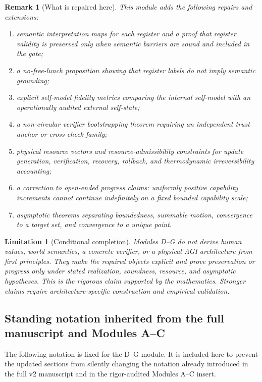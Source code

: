 \documentclass[11pt]{article}
\newtheorem{remark}[theorem]{Remark}
\newtheorem{limitation}[theorem]{Limitation}
\newcommand{\1}{\mathbf{1}}
\begin{document}
\begin{remark}[What is repaired here]
This module adds the following repairs and extensions:
\begin{enumerate}[label=(\alph*)]
    \item semantic interpretation maps for each register and a proof that register validity is preserved only when semantic barriers are sound and included in the gate;
    \item a no-free-lunch proposition showing that register labels do not imply semantic grounding;
    \item explicit self-model fidelity metrics comparing the internal self-model with an operationally audited external self-state;
    \item a non-circular verifier bootstrapping theorem requiring an independent trust anchor or cross-check family;
    \item physical resource vectors and resource-admissibility constraints for update generation, verification, recovery, rollback, and thermodynamic irreversibility accounting;
    \item a correction to open-ended progress claims: uniformly positive capability increments cannot continue indefinitely on a fixed bounded capability scale;
    \item asymptotic theorems separating boundedness, summable motion, convergence to a target set, and convergence to a unique point.
\end{enumerate}
\end{remark}

\begin{limitation}[Conditional completion]
Modules D--G do not derive human values, world semantics, a concrete verifier, or a physical AGI architecture from first principles.  They make the required objects explicit and prove preservation or progress only under stated realization, soundness, resource, and asymptotic hypotheses.  This is the rigorous claim supported by the mathematics.  Stronger claims require architecture-specific construction and empirical validation.
\end{limitation}

\subsection{Standing notation inherited from the full manuscript and Modules A--C}
\label{subsec:DG_standing_notation}

The following notation is fixed for the D--G module.  It is included here to prevent the updated sections from silently changing the notation already introduced in the full v2 manuscript and in the rigor-audited Modules A--C insert.
\end{document}
